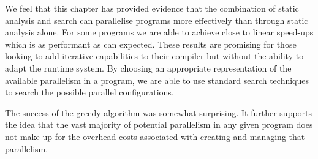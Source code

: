 We feel that this chapter has provided evidence that the combination of static
analysis and search can parallelise programs more effectively than through
static analysis alone. For some programs we are able to achieve close to linear
speed-ups which is as performant as can expected. These results are promising
for those looking to add iterative capabilities to their compiler but without
the ability to adapt the runtime system. By choosing an appropriate
representation of the available parallelism in a program, we are able to use
standard search techniques to search the possible parallel configurations.

The success of the greedy algorithm was somewhat surprising. It further
supports the idea that the vast majority of potential parallelism in any given
program does not make up for the overhead costs associated with creating and
managing that parallelism.
